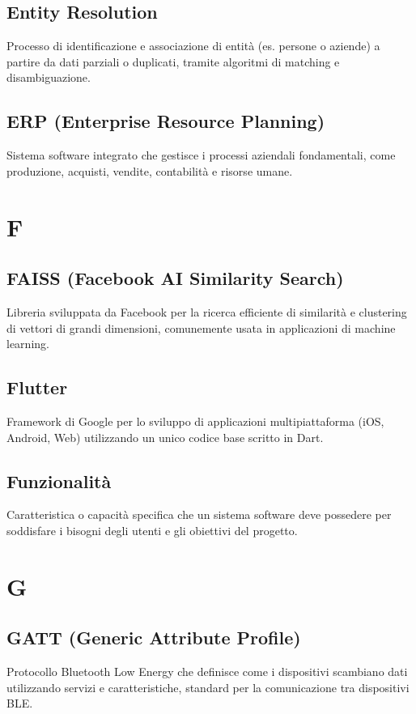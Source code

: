 \documentclass[a4paper,11pt]{article}
\begin{document}
\subsection{Entity Resolution}
Processo di identificazione e associazione di entità (es. persone o aziende) a partire da dati parziali o duplicati, tramite algoritmi di matching e disambiguazione.

\subsection{ERP (Enterprise Resource Planning)}
Sistema software integrato che gestisce i processi aziendali fondamentali, come produzione, acquisti, vendite, contabilità e risorse umane.

\newpage
\section{F}

\subsection{FAISS (Facebook AI Similarity Search)}
Libreria sviluppata da Facebook per la ricerca efficiente di similarità e clustering di vettori di grandi dimensioni, comunemente usata in applicazioni di machine learning.

\subsection{Flutter}
Framework di Google per lo sviluppo di applicazioni multipiattaforma (iOS, Android, Web) utilizzando un unico codice base scritto in Dart.

\subsection{Funzionalità}
Caratteristica o capacità specifica che un sistema software deve possedere per soddisfare i bisogni degli utenti e gli obiettivi del progetto.

\newpage
\section{G}

\subsection{GATT (Generic Attribute Profile)}
Protocollo Bluetooth Low Energy che definisce come i dispositivi scambiano dati utilizzando servizi e caratteristiche, standard per la comunicazione tra dispositivi BLE.
\end{document}
